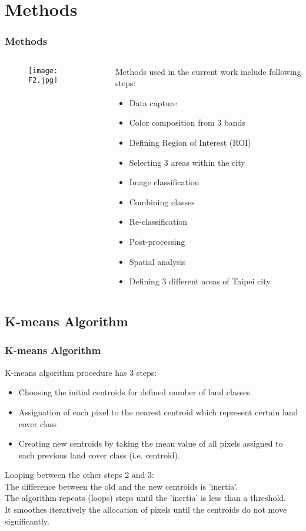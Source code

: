 \documentclass[pdflatex,compress,8pt,
	xcolor={dvipsnames,dvipsnames,svgnames,x11names,table},
	hyperref={	
	breaklinks = true, 
	pdfauthor={Lemenkova Polina}, 
	pdfsubject={Preentation}, 
	pdfcreator={Lemenkova Polina}, 
	pdfproducer={Lemenkova Polina}, 
	colorlinks=true,
	linkcolor=Gold1, 
	citecolor=NavyBlue, 
	urlcolor = NavyBlue, 
	breaklinks = true}]{beamer}
\begin{document}
\section{Methods}
\begin{frame}\frametitle{Methods}
\begin{minipage}[0.4\textheight]{\textwidth}
\begin{columns}[T]
\begin{column}{0.5\textwidth}
\begin{figure}[H]
	\centering
		\texttt{[image: F2.jpg]}
\end{figure}
\end{column}
\begin{column}{0.5\textwidth}
Methods used in the current work include following steps:
\begin{itemize}
	\item Data capture
	\item Color composition from 3 bands
	\item Defining Region of Interest (ROI)
	\item Selecting 3 areas within the city 
	\item Image classification
	\item Combining classes 
	\item Re-classification 
	\item Post-processing
	\item Spatial analysis 
	\item Defining 3 different areas of Taipei city
\end{itemize}
\end{column}
\end{columns}
\end{minipage}
\end{frame}

\subsection{K-means Algorithm}
\begin{frame}\frametitle{K-means Algorithm}
K-means algorithm procedure has 3 steps:
\begin{itemize}
	\item Choosing the initial \alert{centroids} for defined number of land classes
	\item \alert{Assignation} of each pixel to the nearest centroid which represent certain land cover class
	\item Creating new centroids by taking the mean value of all pixels assigned to each previous land cover \alert{class} (i.e. centroid).
\end{itemize}
\alert{Looping} between the other steps 2 and 3: \\
The difference between the old and the new centroids is '\alert{inertia}'. \\
The algorithm repeats (loops) steps until the 'inertia' is less than a \alert{threshold}.\\
It \alert{smoothes iteratively} the allocation of pixels until the centroids do not move significantly.
\end{frame}
 
\end{document}
